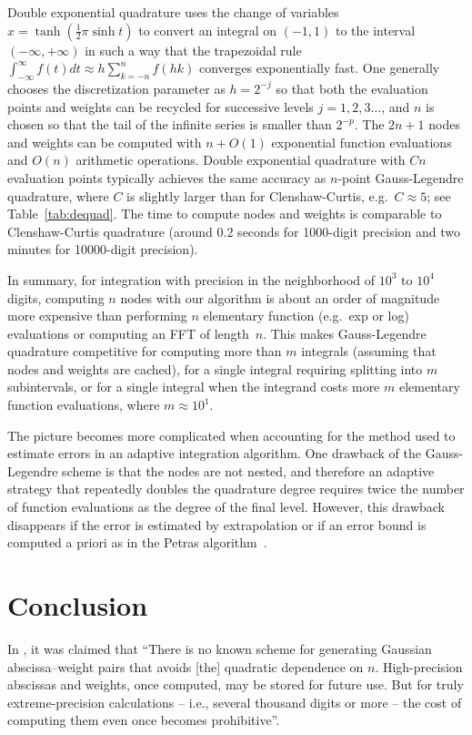 \documentclass[11pt,a4paper]{article}
\begin{document}
Double exponential quadrature uses the change of variables
$x = \tanh(\tfrac12 \pi \sinh t)$ to convert an integral on $(-1,1)$
to the interval $(-\infty,+\infty)$ in such a way that
the trapezoidal rule $\int_{-\infty}^{\infty} f(t) dt \approx h \sum_{k=-n}^{n} f(hk)$
converges exponentially fast.
One generally chooses the discretization parameter as $h = 2^{-j}$ so that
both the evaluation points and weights can be recycled for successive levels
$j = 1, 2, 3\ldots$, and $n$ is chosen so that the tail of the
infinite series is smaller than $2^{-p}$.
The $2n+1$ nodes and weights can be computed with $n + O(1)$
exponential function evaluations and $O(n)$ arithmetic operations.
Double exponential quadrature with $Cn$ evaluation points
typically achieves the same accuracy as $n$-point Gauss-Legendre quadrature,
where $C$ is slightly larger than
for Clenshaw-Curtis, e.g.\ $C \approx 5$; see Table~\ref{tab:dequad}.
The time to compute nodes and weights is comparable
to Clenshaw-Curtis quadrature (around 0.2 seconds for 1000-digit
precision and two minutes for 10000-digit precision).

In summary, for integration
with precision in the neighborhood of $10^3$ to $10^4$ digits,
computing $n$ nodes with our algorithm is about an
order of magnitude more expensive than performing $n$ elementary function (e.g.\ exp or log)
evaluations or computing an FFT of length~$n$.
This makes Gauss-Legendre quadrature competitive for computing more than $m$
integrals (assuming that nodes and weights are cached),
for a single integral requiring splitting into $m$ subintervals,
or for a single integral when the integrand costs more $m$ elementary
function evaluations, where $m \approx 10^1$.

The picture becomes more complicated when accounting for the method
used to estimate errors in an adaptive integration algorithm.
One drawback of the Gauss-Legendre scheme is that the nodes
are not nested, and therefore an adaptive strategy that
repeatedly doubles the quadrature degree
requires twice the number of function evaluations as
the degree of the final level.
However, this drawback disappears if the
error is estimated by extrapolation or if an error bound is computed
a priori as in the Petras algorithm~\cite{petras2002self}.

\section{Conclusion}

In \cite{bailey2011high}, it was claimed that
``There is no known scheme for generating Gaussian abscissa--weight pairs
that avoids [the] quadratic dependence
on $n$. High-precision abscissas
and weights, once computed, may be stored for future use. But for truly
extreme-precision calculations -- i.e., several thousand digits or
more -- the cost of computing them
even once becomes prohibitive''.
\end{document}
